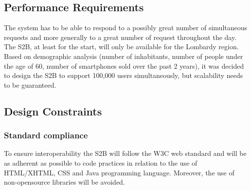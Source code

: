	\begin{enumerate}[resume, label={[R\arabic*]}]
		\item {}
		\item {}
	\end{enumerate}

	\begin{enumerate}[resume, label={[R\arabic*]}]
		\item {}
		\item {}
		\item {}
	\end{enumerate}
	
\subsection{Performance Requirements}
The system has to be able to respond to a possibly great number of simultaneous requests and
more generally to a great number of request throughout the day.
The S2B, at least for the start, will only be available for the Lombardy region. Based on demographic analysis (number of inhabitants, number of people under the age of 60, number of smartphones sold over the past 2 years), it was decided to design the S2B to support 100,000 users simultaneously, but scalability needs to be guaranteed.
\subsection{Design Constraints}
	\subsubsection{Standard compliance}
	To ensure interoperability the S2B will follow the W3C web standard and will be as adherent as possible to code practices in relation to the use of HTML/XHTML, CSS and Java programming language. Moreover, the use of non-opensource libraries will be avoided.

